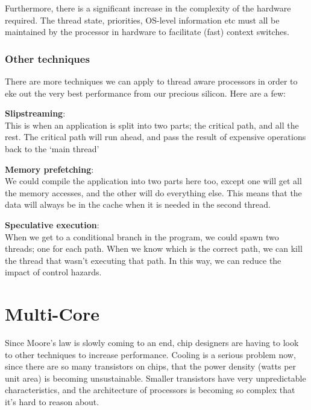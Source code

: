 Furthermore, there is a significant increase in the complexity of the hardware
required. The thread state, priorities, OS-level information etc must all be
maintained by the processor in hardware to facilitate (fast) context switches.

\subsubsection{Other techniques}

There are more techniques we can apply to thread aware processors in order to
eke out the very best performance from our precious silicon. Here are a few:

\begin{description}
  \item \textbf{Slipstreaming}:\\
    This is when an application is split into two parts; the critical path, and
    all the rest. The critical path will run ahead, and pass the result of
    expensive operations back to the `main thread'
  \item \textbf{Memory prefetching}:\\
    We could compile the application into two parts here too, except one will
    get all the memory accesses, and the other will do everything else. This
    means that the data will always be in the cache when it is needed in the 
    second thread.
  \item \textbf{Speculative execution}:\\
    When we get to a conditional branch in the program, we could spawn two
    threads; one for each path. When we know which is the correct path, we can 
    kill the thread that wasn't executing that path. In this way, we can reduce
    the impact of control hazards.
\end{description}

\section{Multi-Core}

Since Moore's law is slowly coming to an end, chip designers are having to look
to other techniques to increase performance. Cooling is a serious problem now,
since there are so many transistors on chips, that the power density (watts per
unit area) is becoming unsustainable. Smaller transistors have very
unpredictable characteristics, and the architecture of processors is becoming so
complex that it's hard to reason about.

